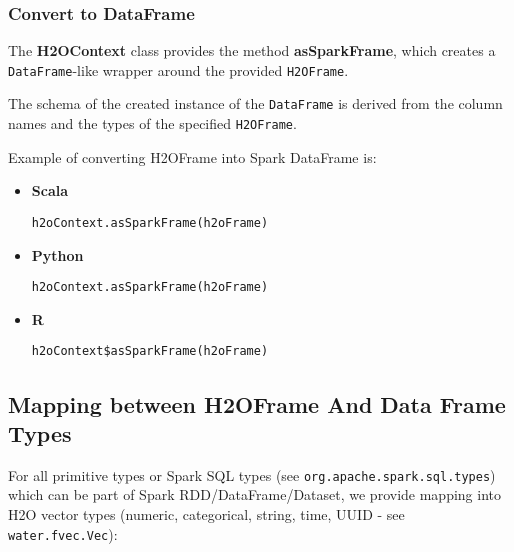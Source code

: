 \documentclass{standalone}
\begin{document}
    \subsubsection{Convert to DataFrame}

    The \textbf{H2OContext} class provides the method \textbf{asSparkFrame}, which creates a \texttt{DataFrame}-like
    wrapper around the provided \texttt{H2OFrame}.

    The schema of the created instance of the \texttt{DataFrame} is derived from the column names and the types of
    the specified \texttt{H2OFrame}.

    Example of converting H2OFrame into Spark DataFrame is:
    \begin{itemize}
        \item \textbf{Scala} \begin{lstlisting}[style=Scala]
h2oContext.asSparkFrame(h2oFrame)
        \end{lstlisting}
        \item \textbf{Python} \begin{lstlisting}[style=Python]
h2oContext.asSparkFrame(h2oFrame)
        \end{lstlisting}
        \item \textbf{R} \begin{lstlisting}[style=R]
h2oContext$asSparkFrame(h2oFrame)
        \end{lstlisting}
    \end{itemize}

    \subsection{Mapping between H2OFrame And Data Frame Types}

    For all primitive types or Spark SQL types (see \linebreak \texttt{org.apache.spark.sql.types}) which
    can be part of Spark RDD/DataFrame/Dataset, we provide mapping into H2O vector types (numeric,
    categorical, string, time, UUID - see \texttt{water.fvec.Vec}):
\end{document}

